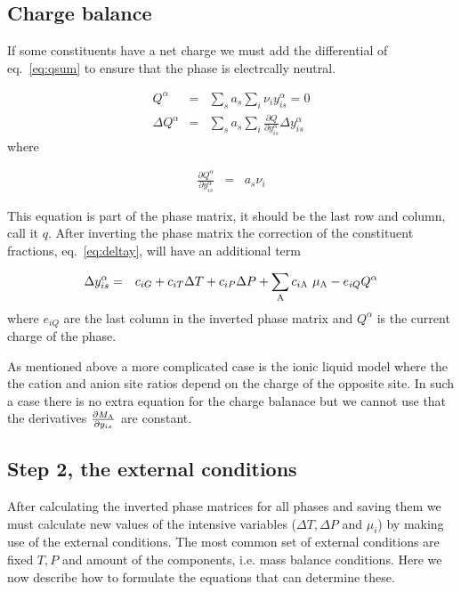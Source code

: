 \documentclass[12pt]{article}
\begin{document}
\subsection{Charge balance}

If some constituents have a net charge we must add the differential
of eq.~\ref{eq:qsum} to ensure that the phase is electrcally neutral.

\begin{eqnarray}
Q^{\alpha} &=& \sum_s a_s \sum_i \nu_i y^{\alpha}_{is} = 0\\
\Delta Q^{\alpha} &=& \sum_s a_s \sum_i \frac{\partial Q}
{\partial y^{\alpha}_{is}} \Delta y^{\alpha}_{is}
\end{eqnarray}
where

\begin{eqnarray}
\frac{\partial Q^{\alpha}}{\partial y^{\alpha}_{is}} &=& a_s \nu_i
\end{eqnarray}

This equation is part of the phase matrix, it should be the last row
and column, call it $q$.  After inverting the phase matrix the
correction of the constituent fractions, eq.~\ref{eq:deltay}, will
have an additional term

\begin{eqnarray}
\Delta y^{\alpha}_{is} &=& c_{iG} + c_{iT}\Delta T + c_{iP}\Delta P +
\sum_{\rm A} c_{i{\rm A}}~\mu_{\rm A}- e_{iQ} Q^{\alpha} \label{eq:dydq}
\end{eqnarray}
where $e_{iQ}$ are the last column in the inverted phase matrix and
$Q^{\alpha}$ is the current charge of the phase.

As mentioned above a more complicated case is the ionic liquid model
where the the cation and anion site ratios depend on the charge of
the opposite site.  In such a case there is no extra equation for the
charge balanace but we cannot use that the derivatives $\frac{\partial
M_{\rm A}}{\partial y_{is}}$ are constant.

\subsection{Step 2, the external conditions}

After calculating the inverted phase matrices for all phases and
saving them we must calculate new values of the intensive variables
($\Delta T, \Delta P$ and $\mu_i$) by making use of the external
conditions.  The most common set of external conditions are fixed $T,
P$ and amount of the components, i.e. mass balance conditions.  Here
we now describe how to formulate the equations that can determine
these.
\end{document}
